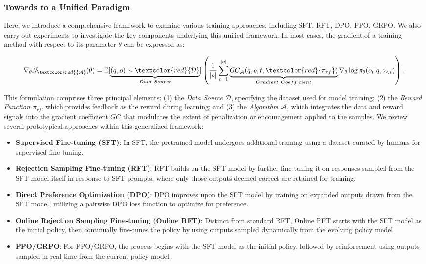 \begin{itemize}[topsep=0pt]
\subsubsection{Towards to a Unified Paradigm} Here, we introduce a comprehensive framework to examine various training approaches, including SFT, RFT, DPO, PPO, GRPO. We also carry out experiments to investigate the key components underlying this unified framework. In most cases, the gradient of a training method with respect to its parameter $\theta$ can be expressed as:

\begin{equation}
    \nabla_{\theta}\mathcal{J}_{\textcolor{red}{\mathcal{A}}}(\theta) = \mathbb{E}[\underbrace{(q,o) \sim \textcolor{red}{\mathcal{D}}}_{Data \ Source}]\left( \frac{1}{|o|} \sum_{t=1}^{|o|}  \underbrace{GC_{{\mathcal{A}}}(q, o, t, \textcolor{red}{\pi_{{rf}}})}_{Gradient \ Coefficient}  \nabla_{\theta}\log \pi_{\theta}(o_t | q, o_{<t})\right).
\label{eq:objective}
\end{equation}

This formulation comprises three principal elements: (1) the \textit{Data Source $\mathcal{D}$}, specifying the dataset used for model training; (2) the \textit{Reward Function $\pi_{{rf}}$}, which provides feedback as the reward during learning; and (3) the \textit{Algorithm $\mathcal{A}$}, which integrates the data and reward signals into the gradient coefficient $GC$ that modulates the extent of penalization or encouragement applied to the samples. We review several prototypical approaches within this generalized framework:

\begin{itemize}
    \item \textbf{Supervised Fine-tuning (SFT)}: In SFT, the pretrained model undergoes additional training using a dataset curated by humans for supervised fine-tuning.
    \item \textbf{Rejection Sampling Fine-tuning (RFT)}: RFT builds on the SFT model by further fine-tuning it on responses sampled from the SFT model itself in response to SFT prompts, where only those outputs deemed correct are retained for training.
    \item \textbf{Direct Preference Optimization (DPO)}: DPO improves upon the SFT model by training on expanded outputs drawn from the SFT model, utilizing a pairwise DPO loss function to optimize for preference.
    \item \textbf{Online Rejection Sampling Fine-tuning (Online RFT)}: Distinct from standard RFT, Online RFT starts with the SFT model as the initial policy, then continually fine-tunes the policy by using outputs sampled dynamically from the evolving policy model.
    \item \textbf{PPO/GRPO}: For PPO/GRPO, the process begins with the SFT model as the initial policy, followed by reinforcement using outputs sampled in real time from the current policy model.
\end{itemize}


\end{itemize}
